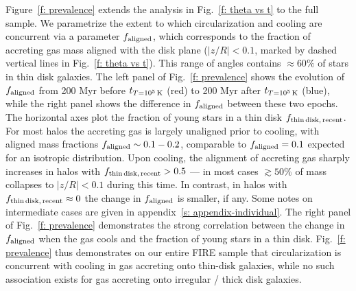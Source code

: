 \documentclass[fleqn,usenatbib]{mnras}
\newcommand{\tcon}{t_{T=10^5\,{\rm K}}}
\begin{document}
Figure~\ref{f: prevalence} extends the analysis in Fig.~\ref{f: theta vs t} to the full sample. We parametrize the extent to which circularization and cooling are concurrent via a parameter $f_{\rm aligned}$, which corresponds to the fraction of accreting gas mass aligned with the disk plane ($\vert z/R \vert < 0.1$, marked by dashed vertical lines in Fig.~\ref{f: theta vs t}). This range of angles contains $\approx 60\%$ of stars in thin disk galaxies.
The left panel of Fig.~\ref{f: prevalence} shows the evolution of $f_{\rm aligned}$ from 200 Myr before $\tcon$ (red) to 200 Myr after $\tcon$ (blue), while the right panel shows the difference in $f_{\rm aligned}$ between these two epochs. The horizontal axes plot the fraction of young stars in a thin disk $f_{\rm thin\,disk,\,recent}$. 
For most halos the accreting gas is largely unaligned prior to cooling, with aligned mass fractions $f_{\rm aligned}\sim 0.1 - 0.2$, comparable to $f_{\rm aligned} = 0.1$ expected for an isotropic distribution.
Upon cooling, the alignment of accreting gas sharply increases in halos with $f_{\rm thin\,disk,\,recent} > 0.5$ --- in most cases $\gtrsim 50\%$ of mass collapses to $\vert z/R \vert < 0.1$ during this time. In contrast, in halos with $f_{\rm thin\,disk,\,recent} \approx 0$ the change in $f_{\rm aligned}$ is smaller, if any. Some notes on intermediate cases are given in appendix~\ref{s: appendix-individual}. The right panel of Fig.~\ref{f: prevalence} demonstrates the strong correlation between the change in $f_{\rm aligned}$ when the gas cools and the fraction of young stars in a thin disk. 
Fig.~\ref{f: prevalence} thus demonstrates on our entire FIRE sample that circularization is concurrent with cooling in gas accreting onto thin-disk galaxies, while no such association exists for gas accreting onto irregular / thick disk galaxies.
\end{document}
